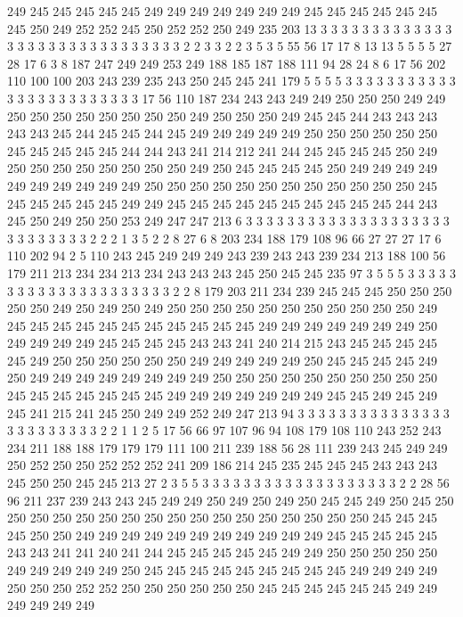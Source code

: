 249 245 245 245 245 245 249 249 249 249 249 249 249 245 245 245 245 245 245 245
250 249 252 252 245 250 252 252 250 249 235 203 13 3 3 3 3 3 3 3
3 3 3 3 3 3 3 3 3 3 3 3 3 3 3 3 3 3 3 3
3 3 3 2 2 3 3 2 2 3 5 3 5 55 56 17 17 8 13 13
5 5 5 5 27 28 17 6 3 8 187 247 249 249 253 249 188 185 187 188
111 94 28 24 8 6 17 56 202 110 100 100 203 243 239 235 243 250 245 245
241 179 5 5 5 5 3 3 3 3 3 3 3 3 3 3 3 3 3 3
3 3 3 3 3 3 3 3 3 3 17 56 110 187 234 243 243 249 249 250
250 250 249 249 250 250 250 250 250 250 250 250 249 250 250 250 249 245 245 244
243 243 243 243 243 245 244 245 245 244 245 249 249 249 249 249 250 250 250 250
250 250 245 245 245 245 245 244 244 243 241 214 212 241 244 245 245 245 245 250
249 250 250 250 250 250 250 250 250 249 250 245 245 245 245 250 249 249 249 249
249 249 249 249 249 249 250 250 250 250 250 250 250 250 250 250 250 250 245 245
245 245 245 245 249 249 245 245 245 245 245 245 245 245 245 245 244 243 245 250
249 250 250 253 249 247 247 213 6 3 3 3 3 3 3 3 3 3 3 3
3 3 3 3 3 3 3 3 3 3 3 3 3 3 3 3 3 2 2 2
1 3 5 2 2 8 27 6 8 203 234 188 179 108 96 66 27 27 27 17
6 110 202 94 2 5 110 243 245 249 249 249 243 239 243 243 239 234 213 188
100 56 179 211 213 234 234 213 234 243 243 243 245 250 245 245 235 97 3 5
5 5 3 3 3 3 3 3 3 3 3 3 3 3 3 3 3 3 3 3
3 3 3 2 2 8 179 203 211 234 239 245 245 245 250 250 250 250 250 249
250 249 250 249 250 250 250 250 250 250 250 250 250 250 250 249 245 245 245 245
245 245 245 245 245 245 245 249 249 249 249 249 249 249 250 249 249 249 249 245
245 245 245 243 243 241 240 214 215 243 245 245 245 245 245 249 250 250 250 250
250 250 249 249 249 249 249 250 245 245 245 245 249 250 249 249 249 249 249 249
249 249 250 250 250 250 250 250 250 250 250 250 245 245 245 245 245 245 245 249
249 249 249 249 249 249 245 245 249 245 249 245 241 215 241 245 250 249 249 252
249 247 213 94 3 3 3 3 3 3 3 3 3 3 3 3 3 3 3 3
3 3 3 3 3 3 3 3 2 2 1 1 2 5 17 56 66 97 107 96
94 108 179 108 110 243 252 243 234 211 188 188 179 179 179 111 100 211 239 188
56 28 111 239 243 245 249 249 250 252 250 250 252 252 252 241 209 186 214 245
235 245 245 245 243 243 243 245 250 250 245 245 213 27 2 3 5 5 3 3
3 3 3 3 3 3 3 3 3 3 3 3 3 3 3 3 3 2 2 28
56 96 211 237 239 243 243 245 249 249 250 249 250 249 250 245 245 249 250 245
250 250 250 250 250 250 250 250 250 250 250 250 250 250 250 250 250 245 245 245
245 250 250 249 249 249 249 249 249 249 249 249 249 249 245 245 245 245 245 243
243 241 241 240 241 244 245 245 245 245 245 249 249 250 250 250 250 250 249 249
249 249 249 250 245 245 245 245 245 245 245 245 245 249 249 249 249 250 250 250
252 252 250 250 250 250 250 250 245 245 245 245 245 245 249 249 249 249 249 249
